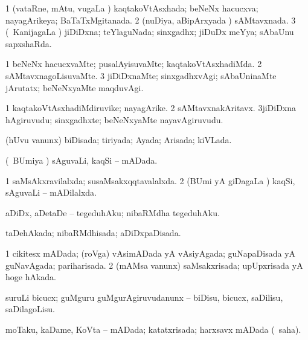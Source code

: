 \bentry
{} 
\gl{\gu}
\expl{}
\bmng
\bnum
\num{1} (vataRne, mAtu, \mo vugaLa \vi) kaqtakoVtAsxhada; beNeNx hacucxva; nayagArikeya; BaTaTxMgitanada. 
\num{2} (nuDiya, aBipArxyada \vi) sAMtavxnada. 
\num{3} (\kanmu\ KanijagaLa \vi) jiDiDxna; teYlaguNada; sinxgadhx; jiDuDx meYya; sAbaUnu sapxshaRda. 
\enum
\emng
\eentry

\bentry
{} 
\gl{\kirxvi}
\expl{}
\bmng
\bnum
\num{1} beNeNx hacucxvaMte; pusalAyisuvaMte; kaqtakoVtAsxhadiMda. 
\num{2} sAMtavxnagoLisuvaMte. 
\num{3} jiDiDxnaMte; sinxgadhxvAgi; sAbaUninaMte jArutatx; beNeNxyaMte maqduvAgi. 
\enum
\emng
\eentry

\bentry
{} 
\gl{\nA}
\expl{}
\bmng
\bnum
\num{1} kaqtakoVtAsxhadiMdiruvike; nayagArike. 
\num{2} sAMtavxnakAritavx. 
\num{3}jiDiDxna hAgiruvudu; sinxgadhxte; beNeNxyaMte nayavAgiruvudu. 
\enum
\emng
\eentry

\bentry
{} 
\gl{\gu}
\expl{}
\bmng
 (hUvu \mo vanunx) biDisada; tiriyada; Ayada; Arisada; kiVLada. 
\emng
\eentry

\bentry
{} 
\gl{\gu}
\expl{}
\bmng
 (\kanmu\ BUmiya \vi) sAguvaLi, kaqSi -- mADada. 
\emng
\eentry

\bentry
{} 
\gl{\gu}
\expl{}
\bmng
\bnum
\num{1} saMsAkxravilalxda; susaMsakxqqtavalalxda. 
\num{2} (BUmi yA giDagaLa \vi) kaqSi, sAguvaLi -- mADilalxda. 
\enum
\emng
\eentry

\bentry
{} 
\gl{\akirx}
\expl{}
\bmng
 aDiDx, aDetaDe -- tegeduhAku; nibaRMdha tegeduhAku. 
\emng
\eentry

\bentry
{} 
\gl{\gu}
\expl{}
\bmng
 taDehAkada; nibaRMdhisada; aDiDxpaDisada. 
\emng
\eentry

\bentry
{} 
\gl{\gu}
\expl{}
\bmng
\bnum
\num{1} cikitesx mADada; (roVga) vAsimADada yA vAsiyAgada; guNapaDisada yA guNavAgada; pariharisada. 
\num{2} (mAMsa \mo vanunx) saMsakxrisada; upUpxrisada yA hoge hAkada. 
\enum
\emng
\eentry

\bentry
{} 
\gl{\akirx}
\expl{}
\bmng
 suruLi bicucx; guMguru guMgurAgiruvudanunx -- biDisu, bicucx, saDilisu, saDilagoLisu. 
\emng
\eentry

\bentry
{} 
\gl{\gu}
\expl{}
\bmng
 moTaku, kaDame, KoVta -- mADada; katatxrisada; harxsavx mADada (\rUpa\ saha). 
\emng
\eentry

